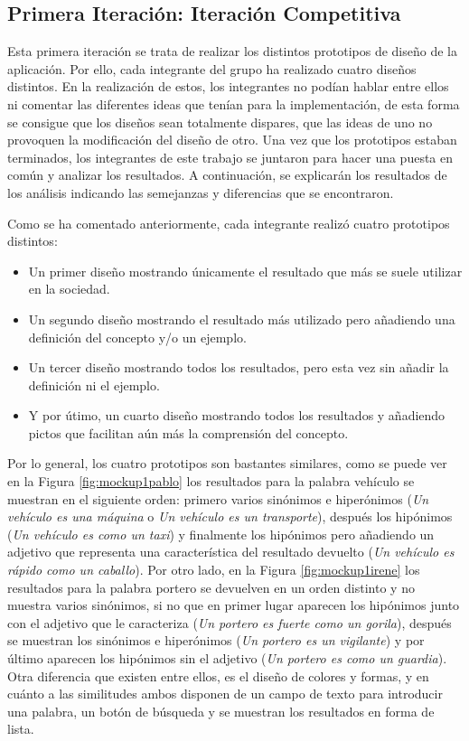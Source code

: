 \subsection{Primera Iteración: Iteración Competitiva}
\label{cap:subsec:iteracionCompetitiva}

Esta primera iteración se trata de realizar los distintos prototipos de diseño de la aplicación. Por ello, cada integrante del grupo ha realizado cuatro diseños distintos. En la realización de estos, los integrantes no podían hablar entre ellos ni comentar las diferentes ideas que tenían para la implementación, de esta forma se consigue que los diseños sean totalmente dispares, que las ideas de uno no provoquen la modificación del diseño de otro.
Una vez que los prototipos estaban terminados, los integrantes de este trabajo se juntaron para hacer una puesta en común y analizar los resultados. A continuación, se explicarán los resultados de los análisis indicando las semejanzas y diferencias que se encontraron.

Como se ha comentado anteriormente, cada integrante realizó cuatro prototipos distintos:
\begin{itemize}
	\item Un primer diseño mostrando únicamente el resultado que más se suele utilizar en la sociedad.
	\item Un segundo diseño mostrando el resultado más utilizado pero añadiendo una definición del concepto y/o un ejemplo.
	\item Un tercer diseño mostrando todos los resultados, pero esta vez sin añadir la definición ni el ejemplo.
	\item Y por útimo, un cuarto diseño mostrando todos los resultados y añadiendo pictos que facilitan aún más la comprensión del concepto.
	
\end{itemize}

Por lo general, los cuatro prototipos son bastantes similares, como se puede ver en la Figura \ref{fig:mockup1pablo} los resultados para la palabra vehículo se muestran en el siguiente orden: primero varios sinónimos e hiperónimos (\textit{Un vehículo es una máquina} o \textit{Un vehículo es un transporte}), después los hipónimos (\textit{Un vehículo es como un taxi}) y finalmente los hipónimos pero añadiendo un adjetivo que representa una característica del resultado devuelto (\textit{Un vehículo es rápido como un caballo}). Por otro lado, en la Figura \ref{fig:mockup1irene} los resultados para la palabra portero se devuelven en un orden distinto y no muestra varios sinónimos, si no que en primer lugar aparecen los hipónimos junto con el adjetivo que le caracteriza (\textit{Un portero es fuerte como un gorila}), después se muestran los sinónimos e hiperónimos (\textit{Un portero es un vigilante}) y por último aparecen los hipónimos sin el adjetivo (\textit{Un portero es como un guardia}). Otra diferencia que existen entre ellos, es el diseño de colores y formas, y en cuánto a las similitudes ambos disponen de un campo de texto para introducir una palabra, un botón de búsqueda y se muestran los resultados en forma de lista.

